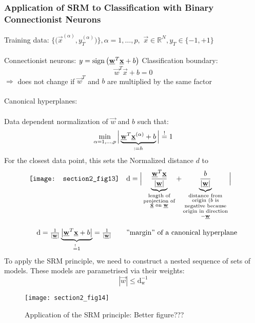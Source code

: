 \subsubsection{Application of SRM to Classification with Binary Connectionist Neurons}
Training data: $\Big\{ \Big( \vec{x}^{(\alpha)}, y_T^{(\alpha)} \Big) \Big\}, \alpha = 1, \ldots, p,$ \indent $\vec{x} \in \mathbb{R}^N, y_T \in \{-1,+1\}$\\\\
Connectionist neurons: $y = \operatorname{sign} \big( \underline{\mathbf{w}}^T \underline{\mathbf{x}} + b \big)$ 
\newpage					%
\noindent Classification boundary:
\begin{equation} \tag{hyperplane}
	\vec{w}^T \vec{x} + b = 0
\end{equation}
\indent $\Rightarrow$ does not change if $\vec{w}^T$ and $b$ are multiplied by the same factor
\\\\
Canonical hyperplanes: 
\\\\
Data dependent normalization of $\vec{w}$ and $b$ such that:
\begin{equation}\label{eq:marginNormalization}
	\min_{\alpha = 1, \ldots, p} \Big| \underbrace{\underline{\mathbf{w}}^T \underline{\mathbf{x}}^{(\alpha)} + b}_{:=h}
		\Big| \stackrel{\mathrm{!}}{=} 1 
\end{equation}
For the closest data point, this sets the Normalized distance $d$ to
\[ \begin{array}{cl}
	\texttt{[image: section2\_fig13]}
	& \mathrm{d} = \Big| 
		\underbrace{ \frac{ \underline{\mathbf{w}}^T \underline{\mathbf{x}} }{ |\underline{\mathbf{w}}| }}_{
			\substack{ \text{length of} \\
				\text{projection of} \\
				\underline{\mathbf{x}} \text{ on } \underline{\mathbf{w}}}}
		+ \underbrace{ \frac{b}{|\underline{\mathbf{w}}|} }_{
			\substack{ \text{distance from} \\
				\text{origin (} b \text{ is} \\
				\text{negative because} \\
				\text{origin in direction} \\
				- \underline{\mathbf{w}}}}
		\Big| \\\\
	\mathrm{d} = \frac{1}{|\underline{\mathbf{w}}|} 
		\underbrace{ \big| \underline{\mathbf{w}}^T \underline{\mathbf{x}} + b \big| }_{
			\stackrel{\mathrm{!}}{=} 1} = \frac{1}{|\underline{\mathbf{w}}|} 
	& \text{''margin'' of a canonical hyperplane}
      \end{array} \] 
To apply the SRM principle, we need to construct a nested sequence of sets of models. These models are parametrised via their weights:
\begin{equation}
	|\vec{w}| \leq \mathrm{d}_{\mathrm{w}}^{-1}
\end{equation}
\begin{figure}[h]
  \centering
\texttt{[image: section2\_fig14]}
  \caption{Application of the SRM principle: Better figure???}
  \label{fig:applicationSRM}
\end{figure}

